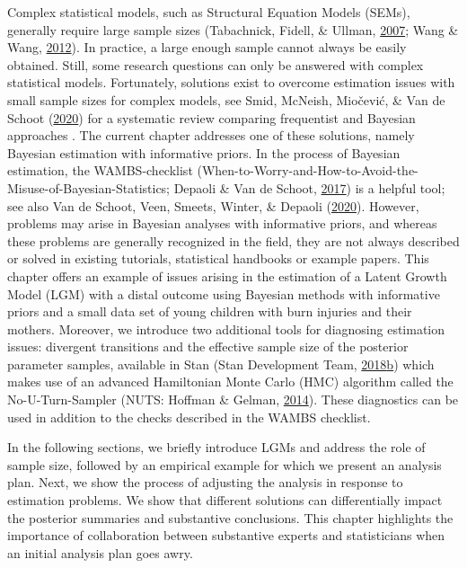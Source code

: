 \documentclass[openright,titlepage,12pt,a4paper]{book}
\begin{document}
Complex statistical models, such as Structural Equation Models (SEMs), generally require large sample sizes (Tabachnick, Fidell, \& Ullman, \protect\hyperlink{ref-tabachnick_using_2007}{2007}; Wang \& Wang, \protect\hyperlink{ref-wang_structural_2012}{2012}). In practice, a large enough sample cannot always be easily obtained. Still, some research questions can only be answered with complex statistical models. Fortunately, solutions exist to overcome estimation issues with small sample sizes for complex models, see Smid, McNeish, Miočević, \& Van de Schoot (\protect\hyperlink{ref-smid_bayesian_2019}{2020}) for a systematic review comparing frequentist and Bayesian approaches . The current chapter addresses one of these solutions, namely Bayesian estimation with informative priors. In the process of Bayesian estimation, the WAMBS-checklist (When-to-Worry-and-How-to-Avoid-the-Misuse-of-Bayesian-Statistics; Depaoli \& Van de Schoot, \protect\hyperlink{ref-depaoli_improving_2017}{2017}) is a helpful tool; see also Van de Schoot, Veen, Smeets, Winter, \& Depaoli (\protect\hyperlink{ref-van_de_schoot_tutorial_2020}{2020}). However, problems may arise in Bayesian analyses with informative priors, and whereas these problems are generally recognized in the field, they are not always described or solved in existing tutorials, statistical handbooks or example papers. This chapter offers an example of issues arising in the estimation of a Latent Growth Model (LGM) with a distal outcome using Bayesian methods with informative priors and a small data set of young children with burn injuries and their mothers. Moreover, we introduce two additional tools for diagnosing estimation issues: divergent transitions and the effective sample size of the posterior parameter samples, available in Stan (Stan Development Team, \protect\hyperlink{ref-stan_development_team_rstan:_2018}{2018}\protect\hyperlink{ref-stan_development_team_rstan:_2018}{b}) which makes use of an advanced Hamiltonian Monte Carlo (HMC) algorithm called the No-U-Turn-Sampler (NUTS: Hoffman \& Gelman, \protect\hyperlink{ref-hoffman_no-u-turn_2014}{2014}). These diagnostics can be used in addition to the checks described in the WAMBS checklist.

In the following sections, we briefly introduce LGMs and address the role of sample size, followed by an empirical example for which we present an analysis plan. Next, we show the process of adjusting the analysis in response to estimation problems. We show that different solutions can differentially impact the posterior summaries and substantive conclusions. This chapter highlights the importance of collaboration between substantive experts and statisticians when an initial analysis plan goes awry.
\end{document}
